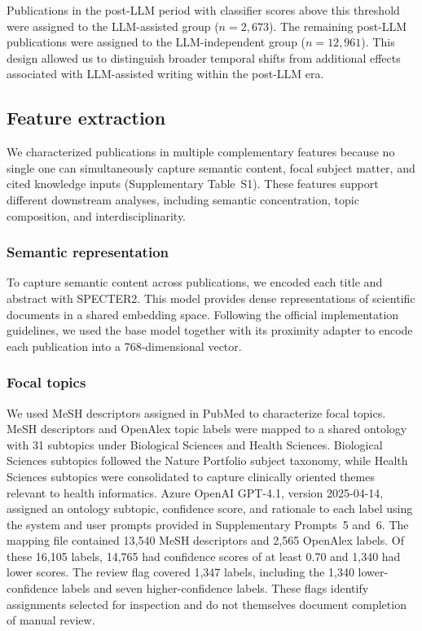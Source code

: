 Publications in the post-LLM period with classifier scores above this threshold were assigned to the LLM-assisted group ($n = 2,673$). The remaining post-LLM publications were assigned to the LLM-independent group ($n = 12,961$). This design allowed us to distinguish broader temporal shifts from additional effects associated with LLM-assisted writing within the post-LLM era.

\subsection*{Feature extraction}
We characterized publications in multiple complementary features because no single one can simultaneously capture semantic content, focal subject matter, and cited knowledge inputs (Supplementary Table~S1). These features support different downstream analyses, including semantic concentration, topic composition, and interdisciplinarity.


\subsubsection*{Semantic representation}
To capture semantic content across publications, we encoded each title and abstract with SPECTER2\cite{singh2022scirepeval,allenai2023specter2base}. This model provides dense representations of scientific documents in a shared embedding space. Following the official implementation guidelines, we used the base model together with its proximity adapter to encode each publication into a 768-dimensional vector.

\subsubsection*{Focal topics}
We used MeSH descriptors assigned in PubMed to characterize focal topics\cite{NLMMeSH2026}. MeSH descriptors and OpenAlex topic labels were mapped to a shared ontology with 31 subtopics under Biological Sciences and Health Sciences. Biological Sciences subtopics followed the Nature Portfolio subject taxonomy, while Health Sciences subtopics were consolidated to capture clinically oriented themes relevant to health informatics. Azure OpenAI GPT-4.1, version 2025-04-14, assigned an ontology subtopic, confidence score, and rationale to each label using the system and user prompts provided in Supplementary Prompts~5 and~6. The mapping file contained 13,540 MeSH descriptors and 2,565 OpenAlex labels. Of these 16,105 labels, 14,765 had confidence scores of at least 0.70 and 1,340 had lower scores. The review flag covered 1,347 labels, including the 1,340 lower-confidence labels and seven higher-confidence labels. These flags identify assignments selected for inspection and do not themselves document completion of manual review.

